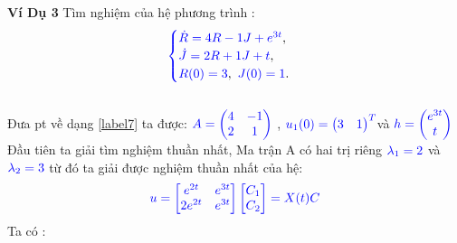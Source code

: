 \documentclass[a4paper]{article}
\begin{document}
 \textbf{Ví Dụ 3}
Tìm nghiệm của hệ phương trình :
 \begin{align}
	    \textcolor{blue}{
	    \begin{cases}
            \dot R = 4R - 1J + e^{3t} \textcolor{black}{,}\\
            \dot J = 2R + 1J +  t \textcolor{black}{,}\\
            R(0) = 3\textcolor{black}{,} \enskip J(0) = 1 \textcolor{black}{.}
        \end{cases}
        }
        \label{label9}
	\end{align}\\
 Đưa pt về dạng \eqref{label7} ta được: 
 \notag
 $\textcolor{blue}{A = \begin{pmatrix} 4 & -1\\ 2 & 1 \end{pmatrix}}$ , \enskip $\textcolor{blue}{u_1(0) = \begin{pmatrix} 3 & 1 \end{pmatrix}\sp{T}}$\enskip và   $\textcolor{blue}{h =\begin{pmatrix} e^{3t} \\ t \end{pmatrix}}$\\
Đầu tiên ta giải tìm nghiệm thuần nhất, Ma trận A có hai trị riêng $\textcolor{blue}{\lambda_1=2}$ và $\textcolor{blue}{\lambda_2=3 }$ từ đó  ta giải được nghiệm thuần nhất của hệ:\\
\begin{align}
\notag
\textcolor{blue}{u= \begin{bmatrix} e^{2t} & e^{3t}\\ 2e^{2t} & e^{3t} \end{bmatrix} \begin{bmatrix} C_1 \\ C_2 \end{bmatrix}=X(t)C}
\end{align}
Ta có :  
\end{document}
